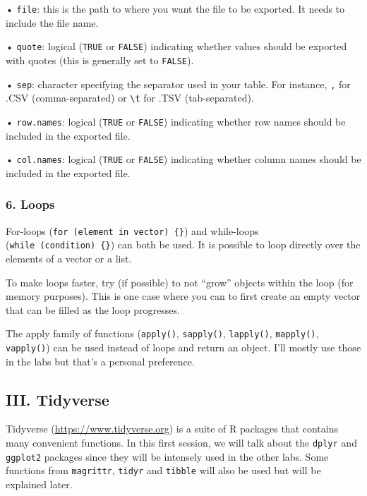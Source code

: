 \documentclass[
]{article}
\begin{document}
• \texttt{file}: this is the path to where you want the file to be
exported. It needs to include the file name.

• \texttt{quote}: logical (\texttt{TRUE} or \texttt{FALSE}) indicating
whether values should be exported with quotes (this is generally set to
\texttt{FALSE}).

• \texttt{sep}: character specifying the separator used in your table.
For instance, \texttt{,} for .CSV (comma-separated) or
\texttt{\textbackslash{}t} for .TSV (tab-separated).

• \texttt{row.names}: logical (\texttt{TRUE} or \texttt{FALSE})
indicating whether row names should be included in the exported file.

• \texttt{col.names}: logical (\texttt{TRUE} or \texttt{FALSE})
indicating whether column names should be included in the exported file.

\hypertarget{loops}{%
\subsubsection{6. Loops}\label{loops}}

For-loops (\texttt{for\ (element\ in\ vector)\ \{\}}) and while-loops
(\texttt{while\ (condition)\ \{\}}) can both be used. It is possible to
loop directly over the elements of a vector or a list.

To make loops faster, try (if possible) to not ``grow'' objects within
the loop (for memory purposes). This is one case where you can to first
create an empty vector that can be filled as the loop progresses.

The apply family of functions (\texttt{apply()}, \texttt{sapply()},
\texttt{lapply()}, \texttt{mapply()}, \texttt{vapply()}) can be used
instead of loops and return an object. I'll mostly use those in the labs
but that's a personal preference.

\hypertarget{iii.-tidyverse}{%
\subsection{III. Tidyverse}\label{iii.-tidyverse}}

Tidyverse (\url{https://www.tidyverse.org}) is a suite of R packages
that contains many convenient functions. In this first session, we will
talk about the \texttt{dplyr} and \texttt{ggplot2} packages since they
will be intensely used in the other labs. Some functions from
\texttt{magrittr}, \texttt{tidyr} and \texttt{tibble} will also be used
but will be explained later.
\end{document}
